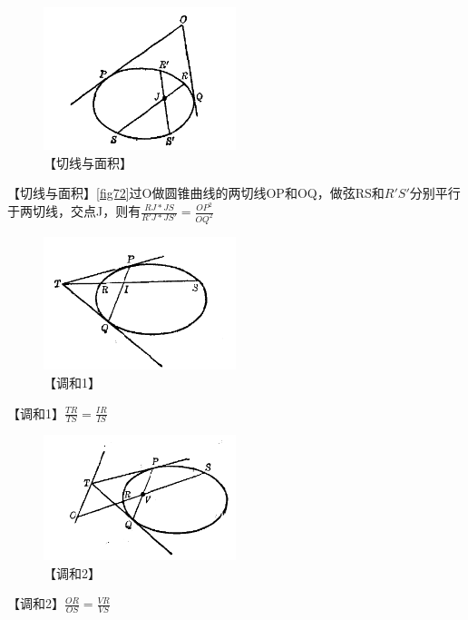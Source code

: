 \begin{figure}[h]
    \centering
    \includegraphics[width=0.5\textwidth]{./resources/古今数学思想-图4_26.png}
    \caption{【切线与面积】}
\end{figure}\label{fig72}


【切线与面积】\ref{fig72}过O做圆锥曲线的两切线OP和OQ，做弦RS和$R'S'$分别平行于两切线，交点J，则有$ \frac{RJ*JS}{R'J*JS'} = \frac{OP^2}{OQ^2}$


\begin{figure}[h]
    \centering
    \includegraphics[width=0.5\textwidth]{./resources/古今数学思想-图4_27.png}
    \caption{【调和1】}\label{fig:7}
\end{figure}
【调和1】$ \frac{TR}{TS} = \frac{IR}{IS}$


\begin{figure}[h]
    \centering
    \includegraphics[width=0.5\textwidth]{./resources/古今数学思想-图4_28.png}
    \caption{【调和2】}\label{fig:7}
\end{figure}
【调和2】$ \frac{OR}{OS} = \frac{VR}{VS}$


